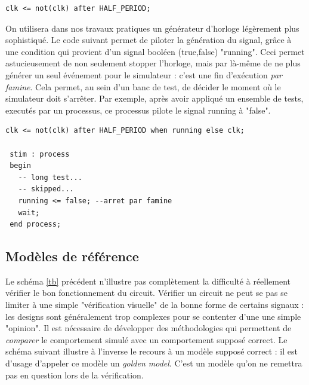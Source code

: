 \begin{lstlisting}[frame=single]
 clk <= not(clk) after HALF_PERIOD;
\end{lstlisting}

On utilisera dans nos travaux pratiques un générateur d'horloge légèrement plus sophistiqué. Le code suivant permet de piloter la génération du signal, grâce
à une condition qui provient d'un signal booléen (true,false) "running". Ceci permet astucieusement de non seulement stopper l'horloge, mais par là-même de
ne plus générer un seul événement pour le simulateur : c'est une fin d'exécution {\it par famine}. Cela permet, au sein d'un banc de test, de décider le moment où le simulateur doit s'arrêter. Par exemple,
après avoir appliqué un ensemble de tests, executés par un processus, ce processus pilote le signal running à "false".

\begin{lstlisting}[frame=single]
 clk <= not(clk) after HALF_PERIOD when running else clk;

 stim : process
 begin
   -- long test...
   -- skipped...
   running <= false; --arret par famine
   wait;
 end process;
\end{lstlisting}

\subsection{Modèles de référence}
Le schéma \ref{tb} précédent n'illustre pas complètement la difficulté à réellement vérifier le bon fonctionnement du circuit. Vérifier un circuit
ne peut se pas se limiter à une simple "vérification visuelle" de la bonne forme de certains signaux : les designs sont généralement trop complexes pour
se contenter d'une une simple "opinion".
Il est nécessaire de développer des méthodologies qui permettent de {\it comparer} le comportement simulé avec un comportement supposé correct.
Le schéma suivant illustre à l'inverse le recours à un modèle supposé correct : il est d'usage d'appeler ce modèle un {\it golden model}. C'est un modèle
qu'on ne remettra pas en question lors de la vérification.

